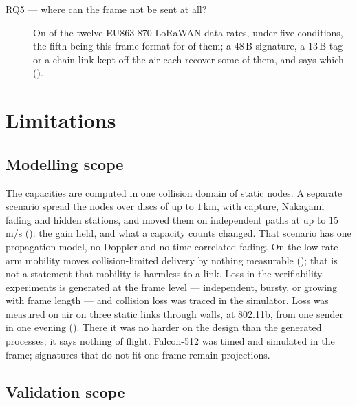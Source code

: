 \begin{description}
\item[RQ5 --- where can the frame not be sent at all?] On \exclCount{} of the twelve
EU863-870 LoRaWAN data rates, under five conditions, the fifth being this frame format for
\exclFmtCount{} of them; a $48$\,B signature, a $13$\,B tag or a
chain link kept off the air each recover some of them, and  says which
().
\end{description}

\section{Limitations}

\subsection{Modelling scope}

The capacities are computed in one collision domain of static nodes. A separate scenario spread
the nodes over discs of up to $1$\,km, with capture, Nakagami fading and hidden stations, and
moved them on independent paths at up to $15$\,m/s (): the gain held, and
what a capacity counts changed. That scenario has one propagation model, no Doppler and no
time-correlated fading. On the low-rate arm mobility moves collision-limited delivery by nothing
measurable (); that is not a statement that mobility is harmless to a
link. Loss in the verifiability experiments is generated at the frame level --- independent,
bursty, or growing with frame length --- and collision loss was traced in the simulator. Loss
was measured on air on three static links through walls, at 802.11b, from one sender in one evening
(). There it was no harder on the design than the generated processes; it says
nothing of flight. Falcon-512 was timed and simulated in the frame; signatures that do not fit
one frame remain projections.

\subsection{Validation scope}

